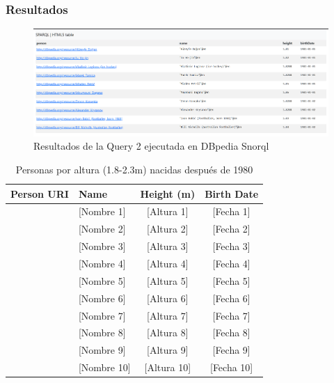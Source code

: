 \documentclass[12pt,a4paper]{article}
\begin{document}
\subsubsection{Resultados}

\begin{figure}[H]
    \centering
    \includegraphics[width=\textwidth]{screenshots/Qiery2.png}
    \caption{Resultados de la Query 2 ejecutada en DBpedia Snorql}
    \label{fig:query2_results}
\end{figure}

\begin{table}[H]
    \centering
    \caption{Personas por altura (1.8-2.3m) nacidas después de 1980}
    \label{tab:query2_results}
    \begin{tabular}{|l|l|c|c|}
        \hline
        \textbf{Person URI} & \textbf{Name} & \textbf{Height (m)} & \textbf{Birth Date} \\
        \hline
        [URI 1] & [Nombre 1] & [Altura 1] & [Fecha 1] \\
        [URI 2] & [Nombre 2] & [Altura 2] & [Fecha 2] \\
        [URI 3] & [Nombre 3] & [Altura 3] & [Fecha 3] \\
        [URI 4] & [Nombre 4] & [Altura 4] & [Fecha 4] \\
        [URI 5] & [Nombre 5] & [Altura 5] & [Fecha 5] \\
        [URI 6] & [Nombre 6] & [Altura 6] & [Fecha 6] \\
        [URI 7] & [Nombre 7] & [Altura 7] & [Fecha 7] \\
        [URI 8] & [Nombre 8] & [Altura 8] & [Fecha 8] \\
        [URI 9] & [Nombre 9] & [Altura 9] & [Fecha 9] \\
        [URI 10] & [Nombre 10] & [Altura 10] & [Fecha 10] \\
        \hline
    \end{tabular}
\end{table}
\end{document}
